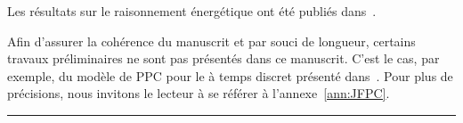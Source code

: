 \begin{center}
\begin{minipage}{\textwidth}
{      Les résultats sur le raisonnement énergétique ont été publiés
      dans~\cite{Nattaf_CPDP,Nattaf_Constraints,Nattaf_ORSpectrum}.

      Afin d'assurer la cohérence du manuscrit et par souci de
      longueur, certains travaux préliminaires ne sont pas présentés
      dans ce manuscrit. C'est le cas, par exemple, du modèle de PPC
      pour le \CECSP à temps discret présenté
      dans~\cite{Nattaf_JFPC}. Pour plus de précisions, nous invitons
      le lecteur à se référer à l'annexe~\ref{ann:JFPC}.
 }
    \vspace{0.5cm}
    \hrule
  \end{minipage}
\end{center}



